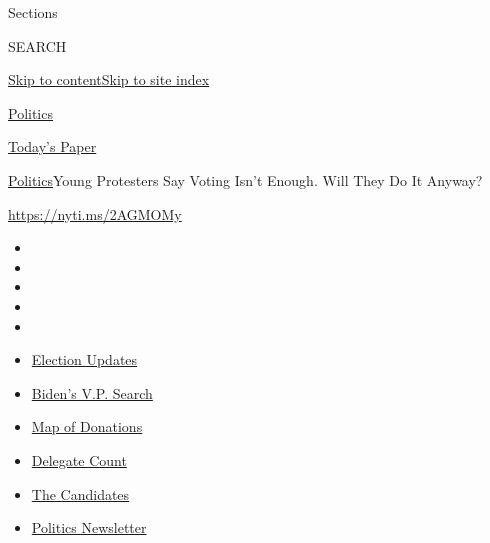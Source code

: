 Sections

SEARCH

\protect\hyperlink{site-content}{Skip to
content}\protect\hyperlink{site-index}{Skip to site index}

\href{https://www.nytimes.com/section/politics}{Politics}

\href{https://myaccount.nytimes.com/auth/login?response_type=cookie\&client_id=vi}{}

\href{https://www.nytimes.com/section/todayspaper}{Today's Paper}

\href{/section/politics}{Politics}\textbar{}Young Protesters Say Voting
Isn't Enough. Will They Do It Anyway?

\url{https://nyti.ms/2AGMOMy}

\begin{itemize}
\item
\item
\item
\item
\item
\end{itemize}

\begin{itemize}
\item
  \href{https://www.nytimes.com/2020/07/31/us/elections/biden-vs-trump.html?action=click\&pgtype=Article\&state=default\&region=TOP_BANNER\&context=storylines_menu}{Election
  Updates}
\item
  \href{https://www.nytimes.com/article/biden-vice-president-2020.html?action=click\&pgtype=Article\&state=default\&region=TOP_BANNER\&context=storylines_menu}{Biden's
  V.P. Search}
\item
  \href{https://www.nytimes.com/interactive/2020/07/24/us/politics/trump-biden-campaign-donors.html?action=click\&pgtype=Article\&state=default\&region=TOP_BANNER\&context=storylines_menu}{Map
  of Donations}
\item
  \href{https://www.nytimes.com/interactive/2020/us/elections/delegate-count-primary-results.html?action=click\&pgtype=Article\&state=default\&region=TOP_BANNER\&context=storylines_menu}{Delegate
  Count}
\item
  \href{https://www.nytimes.com/interactive/2019/us/politics/2020-presidential-candidates.html?action=click\&pgtype=Article\&state=default\&region=TOP_BANNER\&context=storylines_menu}{The
  Candidates}
\item
  \href{https://www.nytimes.com/newsletters/politics?action=click\&pgtype=Article\&state=default\&region=TOP_BANNER\&context=storylines_menu}{Politics
  Newsletter}
\end{itemize}

